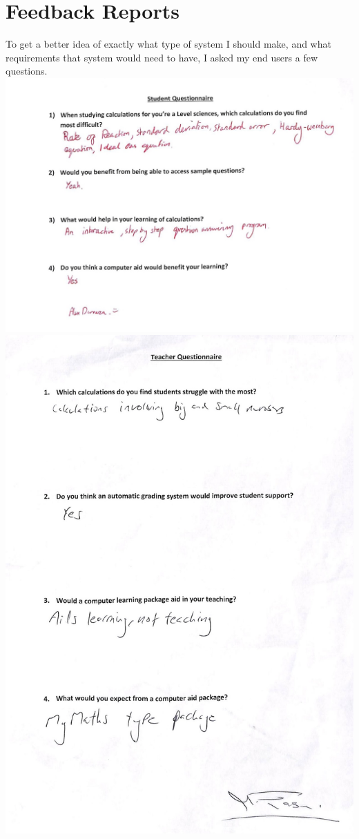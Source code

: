 \documentclass[a4paper,12pt]{report}
\begin{document}
\section{Feedback Reports}
To get a better idea of exactly what type of system I should make, and what requirements that system would need to have, I asked my end users a few questions.
\includegraphics{StudentQuestionnaire}
\includegraphics{TeacherQuestionnaire}
\end{document}
